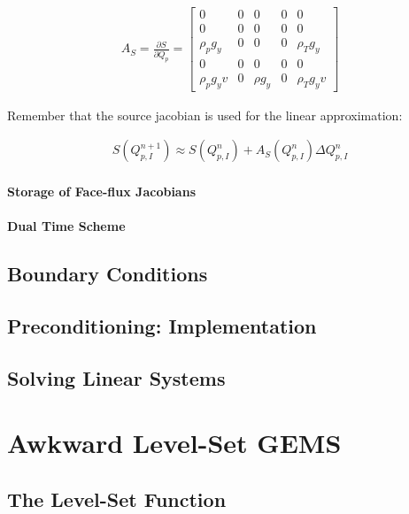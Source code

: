 \documentclass[12pt, letterpaper]{report}
\begin{document}
\begin{align*}
   A_S = \frac{\partial S}{\partial Q_p} = \begin{bmatrix}
      0 & 0 & 0 & 0 & 0 \\
      0 & 0 & 0 & 0 & 0 \\
      \rho_p g_y & 0 & 0 & 0 & \rho_T g_y \\
      0 & 0 & 0 & 0 & 0 \\
      \rho_p g_y v & 0 & \rho g_y & 0 & \rho_T g_y v
   \end{bmatrix}
\end{align*}

Remember that the source jacobian is used for the linear approximation:

\begin{align*}
   S(Q_{p,I}^{n+1}) \approx S(Q_{p,I}^n) + A_S(Q_{p,I}^n) \Delta Q_{p,I}^n
\end{align*}

\subsubsection{Storage of Face-flux Jacobians}

\subsubsection{Dual Time Scheme}


\clearpage
\section{Boundary Conditions}

\section{Preconditioning: Implementation}

\section{Solving Linear Systems}

\chapter{Awkward Level-Set GEMS}

\section{The Level-Set Function}
\end{document}
